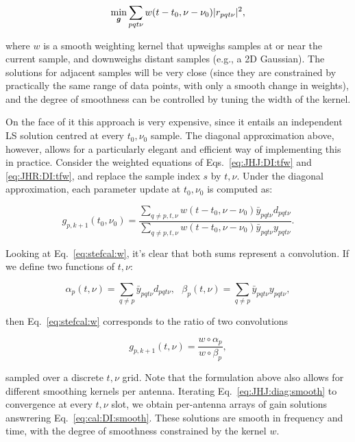\documentclass[useAMS,usenatbib]{mn2e}
\begin{document}
\begin{equation}
\label{eq:cal:DI:smooth}
\min_{\bmath{g}}\sum_{pqt\nu}w(t-t_0,\nu-\nu_0)|r_{pqt\nu}|^2, 
\end{equation}

where $w$ is a smooth weighting kernel that upweighs samples at or near the current sample, and downweighs distant 
samples (e.g., a 2D Gaussian). The solutions for adjacent samples will be very close (since they 
are constrained by practically the same range of data points, with only a smooth change in weights), and the 
degree of smoothness can be controlled by tuning the width of the kernel.

On the face of it this approach is very expensive, since it entails an independent LS solution centred at 
every $t_0,\nu_0$ sample. The diagonal approximation above, however, allows for a particularly elegant and efficient way of 
implementing this in practice. Consider the weighted equations of Eqs.~\ref{eq:JHJ:DI:tfw} and \ref{eq:JHR:DI:tfw}, 
and replace the sample index $s$ by $t,\nu$. Under the diagonal approximation, each parameter update at $t_0,\nu_0$ is 
computed as:

\begin{equation}
\label{eq:stefcal:w}
g_{p,{k+1}}(t_0,\nu_0) = \frac{\sum\limits_{q\ne p,t,\nu} w(t-t_0,\nu-\nu_0) \bar{y}_{pqt\nu} d_{pqt\nu} }
{\sum\limits_{q\ne p,t,\nu} w(t-t_0,\nu-\nu_0) \bar{y}_{pqt\nu} y_{pqt\nu}}.
\end{equation}

Looking at Eq.~\ref{eq:stefcal:w}, it's clear that both sums represent a convolution. If we define two functions of $t,\nu$:

\[
\alpha_p(t,\nu) = \sum\limits_{q\ne p} \bar{y}_{pqt\nu} d_{pqt\nu},~~~
\beta_p(t,\nu) = \sum\limits_{q\ne p} \bar{y}_{pqt\nu} y_{pqt\nu},
\]

then Eq.~\ref{eq:stefcal:w} corresponds to the ratio of two convolutions

\begin{equation}
\label{eq:JHJ:diag:smooth}
g_{p,k+1}(t,\nu) = \frac{w\circ \alpha_p}{w\circ\beta_p},
\end{equation}

sampled over a discrete $t,\nu$ grid. Note that the formulation above also allows for different smoothing kernels per antenna.
Iterating Eq.~\ref{eq:JHJ:diag:smooth} to convergence at every $t,\nu$ slot, we obtain per-antenna arrays of gain solutions 
answrering Eq.~\ref{eq:cal:DI:smooth}. These solutions are smooth in frequency and time, with the degree of smoothness 
constrained by the kernel $w$. 
\end{document}
